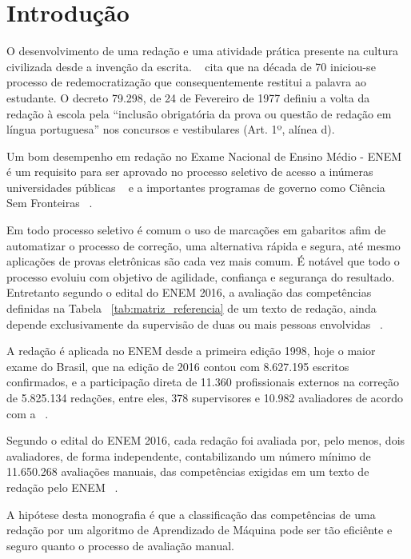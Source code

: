 \chapter{Introdução}\label{CAP:introducao}

\noindent O desenvolvimento de uma redação e uma atividade prática presente na cultura civilizada desde a invenção da escrita. ~\cite{lara:1995} cita que na década de 70 iniciou-se processo de redemocratização que consequentemente restitui a palavra ao estudante. O decreto 79.298, de 24 de Fevereiro de 1977 definiu a volta da redação à escola pela ``inclusão obrigatória da prova ou questão de redação em língua portuguesa'' nos concursos e vestibulares (Art. 1º, alínea d).

Um bom desempenho em redação no Exame Nacional de Ensino Médio - ENEM é um requisito para ser aprovado no processo seletivo de acesso a inúmeras universidades públicas ~\cite{sisu:2017} e a importantes programas de governo como Ciência Sem Fronteiras ~\cite{csf:2017}.

Em todo processo seletivo é comum o uso de marcações em gabaritos afim de automatizar o processo de correção, uma alternativa rápida e segura, até mesmo aplicações de provas eletrônicas são cada vez mais comum. É notável que todo o processo evoluiu com objetivo de agilidade, confiança e segurança do resultado. Entretanto segundo o edital do ENEM 2016, a avaliação das competências definidas na Tabela ~\ref{tab:matriz_referencia} de um texto de redação, ainda depende exclusivamente da supervisão de duas ou mais pessoas envolvidas ~\cite{edital_enem:2016}.

A redação é aplicada no ENEM desde a primeira edição 1998, hoje o maior exame do Brasil, que na edição de 2016 contou com 8.627.195 escritos confirmados, e a participação direta de 11.360 profissionais externos na correção de 5.825.134 redações, entre eles, 378 supervisores e 10.982 avaliadores de acordo com a ~\cite{relatorio_de_gestao:2016}. 

Segundo o edital do ENEM 2016, cada redação foi avaliada por, pelo menos, dois avaliadores, de forma independente, contabilizando um número mínimo de 11.650.268 avaliações manuais, das competências exigidas em um texto de redação pelo ENEM ~\cite{edital_enem:2016}.

A hipótese desta monografia é que a classificação das competências de uma redação por um algoritmo de Aprendizado de Máquina pode ser tão eficiênte e seguro quanto o processo de avaliação manual.

